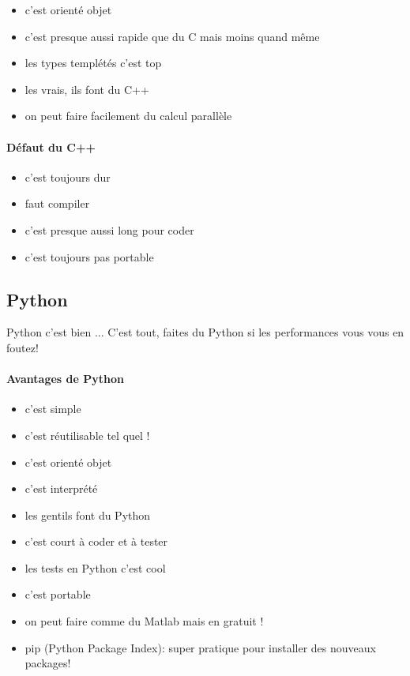 \begin{itemize}
\item c'est orienté objet
\item c'est presque aussi rapide que du C mais moins quand même
\item les types templétés c'est top
\item les vrais, ils font du C++
\item on peut faire facilement du calcul parallèle
\end{itemize}

\paragraph{Défaut du C++}

\begin{itemize}
\item c'est toujours dur
\item faut compiler
\item c'est presque aussi long pour coder
\item c'est toujours pas portable
\end{itemize}

\subsection{Python}

Python c'est bien ... C'est tout, faites du Python si les performances vous vous en foutez!

\paragraph{Avantages de Python}
\begin{itemize}
\item c'est simple
\item c'est réutilisable tel quel ! 
\item c'est orienté objet
\item c'est interprété
\item les gentils font du Python
\item c'est court à coder et à  tester
\item les tests en Python c'est cool
\item c'est portable
\item on peut faire comme du Matlab mais en gratuit !
\item pip (Python Package Index): super pratique pour installer des nouveaux packages!
\end{itemize}

